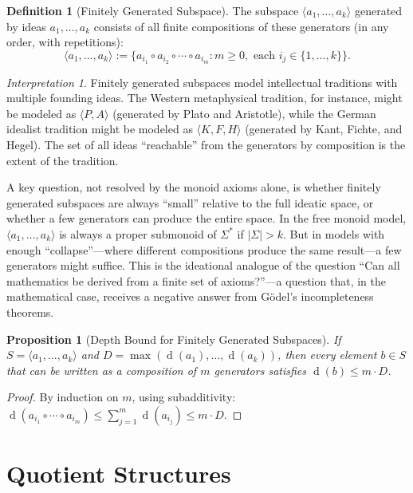 \documentclass[11pt,openany]{book}
\theoremstyle{definition}
\newtheorem{definition}[axiom]{Definition}
\theoremstyle{plain}
\newtheorem{proposition}[axiom]{Proposition}
\theoremstyle{remark}
\newtheorem{interpretation}[axiom]{Interpretation}
\newcommand{\compose}{\circ}                 %
\newcommand{\depth}{\operatorname{d}}       %
\begin{document}
\begin{definition}[Finitely Generated Subspace]
The subspace $\langle a_1, \ldots, a_k \rangle$ generated by ideas $a_1, \ldots, a_k$ consists of all finite compositions of these generators (in any order, with repetitions):
\[
\langle a_1, \ldots, a_k \rangle := \{a_{i_1} \compose a_{i_2} \compose \cdots \compose a_{i_m} : m \geq 0, \text{ each } i_j \in \{1, \ldots, k\}\}.
\]
\end{definition}

\begin{interpretation}
Finitely generated subspaces model intellectual traditions with multiple founding ideas. The Western metaphysical tradition, for instance, might be modeled as $\langle P, A \rangle$ (generated by Plato and Aristotle), while the German idealist tradition might be modeled as $\langle K, F, H \rangle$ (generated by Kant, Fichte, and Hegel). The set of all ideas ``reachable'' from the generators by composition is the extent of the tradition.

A key question, not resolved by the monoid axioms alone, is whether finitely generated subspaces are always ``small'' relative to the full ideatic space, or whether a few generators can produce the entire space. In the free monoid model, $\langle a_1, \ldots, a_k \rangle$ is always a proper submonoid of $\Sigma^*$ if $|\Sigma| > k$. But in models with enough ``collapse''---where different compositions produce the same result---a few generators might suffice. This is the ideational analogue of the question ``Can all mathematics be derived from a finite set of axioms?''---a question that, in the mathematical case, receives a negative answer from Gödel's incompleteness theorems.
\end{interpretation}

\begin{proposition}[Depth Bound for Finitely Generated Subspaces]
If $S = \langle a_1, \ldots, a_k \rangle$ and $D = \max(\depth(a_1), \ldots, \depth(a_k))$, then every element $b \in S$ that can be written as a composition of $m$ generators satisfies $\depth(b) \leq m \cdot D$.
\end{proposition}

\begin{proof}
By induction on $m$, using subadditivity: $\depth(a_{i_1} \compose \cdots \compose a_{i_m}) \leq \sum_{j=1}^{m} \depth(a_{i_j}) \leq m \cdot D$.
\end{proof}

\section{Quotient Structures}
\end{document}
